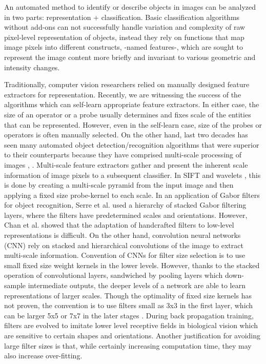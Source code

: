 \documentclass{bmvc2k}
\begin{document}
An automated method to identify or describe objects in images can be analyzed in two parts: representation + classification. Basic classification algorithms without add-ons can not successfully handle variation and complexity of raw pixel-level representation of objects, instead they rely on functions that map image pixels into different constructs, -named features-, which are sought to represent the image content more briefly and invariant to various geometric and intensity changes.

Traditionally, computer vision researchers relied on manually designed feature extractors for representation. Recently, we are witnessing the success of the algorithms which can self-learn appropriate feature extractors. In either case, the size of an operator or a probe usually determines and fixes scale of the entities that can be represented. However, even in the self-learn case, size of the probes or operators is often manually selected. On the other hand, last two decades has seen many automated object detection/recognition algorithms that were superior to their counterparts because they have comprised multi-scale processing of images \cite{dalal2005histograms}, \cite{lenet}. Multi-scale feature extractors gather and present the inherent scale information of image pixels to a subsequent classifier. In SIFT \cite{lowe} and wavelets \cite{mallat1992characterization}, this is done by creating a multi-scale pyramid from the input image and then applying a fixed size probe-kernel to each scale. In an application of Gabor filters for object recognition, Serre et al. \cite{serre} used a hierarchy of stacked Gabor filtering layers, where the filters have predetermined scales and orientations. However, Chan et al. \cite{pcanet} showed that the adaptation of handcrafted filters to low-level representations is difficult. On the other hand, convolution neural networks (CNN) rely on stacked and hierarchical convolutions of the image to extract multi-scale information. Convention of CNNs for filter size selection is to use small fixed size weight kernels in the lower levels. However, thanks to the stacked operation of convolutional layers, sandwiched by pooling layers which down-sample intermediate outputs, the deeper levels of a network are able to learn representations of larger scales. Though the optimality of fixed size kernels has not proven, the convention is to use filters small as 3x3 in the first layer, which can be larger 5x5 or 7x7 in the later stages \cite{Zeiler2014}. During back propagation training, filters are evolved to imitate lower level receptive fields in biological vision which are sensitive to certain shapes and orientations. Another justification for avoiding large filter sizes is that, while certainly increasing computation time, they may also increase over-fitting.
\end{document}
